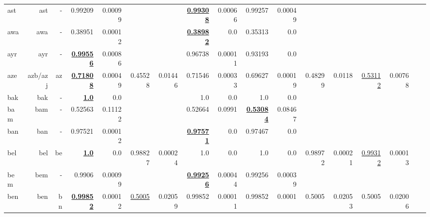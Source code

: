 \documentclass[11pt]{article}
\begin{document}
\begin{table*}[h]
{\begin{tabular}{lrrrrrrrrrrrrrrrr}
ast         & ast         & -         & 0.99209         & 0.00099         &          &          & \textbf{\underline{0.99308}}         & 0.00066         & 0.99257         & 0.00049         &          &          &          &          \\
awa         & awa         & -         & 0.38951         & 0.00012         &          &          & \textbf{\underline{0.38982}}         & 0.0         & 0.35313         & 0.0         &          &          &          &          \\
ayr         & ayr         & -         & \textbf{\underline{0.99556}}         & 0.00086         &          &          & 0.96738         & 0.00011         & 0.93193         & 0.0         &          &          &          &          \\
aze         & azb/azj         & az         & \textbf{\underline{0.71808}}         & 0.00049         & 0.45528         & 0.01446         & 0.71546         & 0.00033         & 0.69627         & 0.00019         & 0.48299         & 0.0118         & \underline{0.53112}         & 0.00768         \\
bak         & bak         & -         & \textbf{\underline{1.0}}         & 0.0         &          &          & 1.0         & 0.0         & 1.0         & 0.0         &          &          &          &          \\
bam         & bam         & -         & 0.52563         & 0.11122         &          &          & 0.52664         & 0.0991         & \textbf{\underline{0.53084}}         & 0.08467         &          &          &          &          \\
ban         & ban         & -         & 0.97521         & 0.00012         &          &          & \textbf{\underline{0.97571}}         & 0.0         & 0.97467         & 0.0         &          &          &          &          \\
bel         & bel         & be         & \textbf{\underline{1.0}}         & 0.0         & 0.98827         & 0.00024         & 1.0         & 0.0         & 1.0         & 0.0         & 0.98972         & 0.00021         & \underline{0.99312}         & 0.00013         \\
bem         & bem         & -         & 0.9906         & 0.00099         &          &          & \textbf{\underline{0.99256}}         & 0.00044         & 0.99256         & 0.00039         &          &          &          &          \\
ben         & ben         & bn         & \textbf{\underline{0.99852}}         & 0.00012         & \underline{0.5005}         & 0.02059         & 0.99852         & 0.00011         & 0.99852         & 0.0001         & 0.5005         & 0.02053         & 0.5005         & 0.02006         \\

\end{tabular}}
\end{table*}
\end{document}
